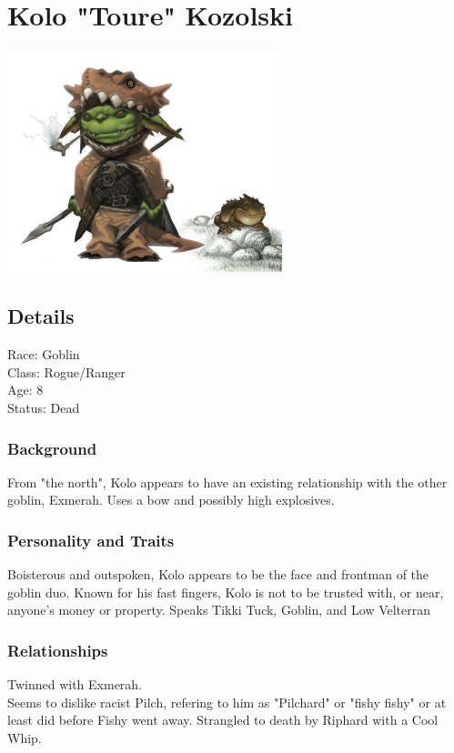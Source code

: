 \section{Kolo "Toure" Kozolski}

\begin{center}
\includegraphics[width=80mm]{./content/img/krokokolo.png}
\begin{figure}[h]
\end{figure}
\end{center}

\subsection*{Details}

\noindent

Race: Goblin\\
Class: Rogue/Ranger\\
Age: 8\\
Status: Dead

\subsubsection{Background}

From "the north", Kolo appears to have an existing relationship with the other goblin, Exmerah. Uses a bow and possibly high explosives.

\subsubsection{Personality and Traits}

Boisterous and outspoken, Kolo appears to be the face and frontman of the goblin duo.
Known for his fast fingers, Kolo is not to be trusted with, or near, anyone's money or property.
Speaks Tikki Tuck, Goblin, and Low Velterran

\subsubsection{Relationships}

Twinned with Exmerah.\\

Seems to dislike racist Pilch, refering to him as "Pilchard" or "fishy fishy" or at least did before Fishy went away.\smallskip
Strangled to death by Riphard with a Cool Whip.

\clearpage